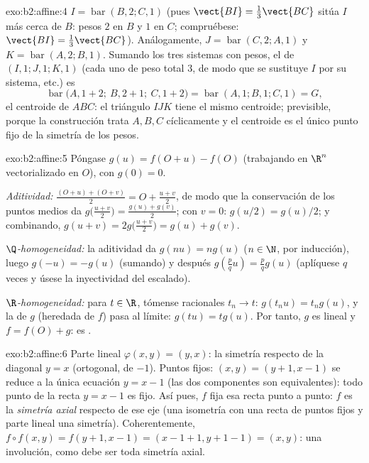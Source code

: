 \begin{solution}{exo:b2:affine:4}
$I = \operatorname{bar}(B, 2; C, 1)$ (pues $\vect{BI} =
\frac13\vect{BC}$ sitúa $I$ más cerca de $B$: pesos $2$ en $B$ y $1$
en $C$; compruébese: $\vect{BI} = \frac{1}{3}\vect{BC}$).
Análogamente, $J = \operatorname{bar}(C, 2; A, 1)$ y $K =
\operatorname{bar}(A, 2; B, 1)$. Sumando los tres sistemas con pesos,
el  de $(I, 1; J, 1; K, 1)$ (cada uno de peso total $3$,
de modo que se sustituye $I$ por su sistema, etc.) es
\[
\operatorname{bar}\bigl(A, 1 + 2;\ B, 2 + 1;\ C, 1 + 2\bigr)
= \operatorname{bar}(A, 1; B, 1; C, 1) = G ,
\]
el centroide de $ABC$: el triángulo $IJK$ tiene el mismo centroide;
previsible, porque la construcción trata $A, B, C$ cíclicamente y el
centroide es el único punto fijo de la simetría  de los
pesos.
\end{solution}

\begin{solution}{exo:b2:affine:5}
Póngase $g(u) = f(O + u) - f(O)$ (trabajando en $\R^n$ vectorializado
en $O$), con $g(0) = 0$.

\emph{Aditividad:} $\frac{(O + u) + (O + v)}{2} = O + \frac{u +
v}{2}$, de modo que la conservación de los puntos medios da
$g\bigl(\frac{u+v}{2}\bigr) = \frac{g(u) + g(v)}{2}$; con $v = 0$:
$g(u/2) = g(u)/2$; y combinando, $g(u + v) =
2g\bigl(\frac{u+v}{2}\bigr) = g(u) + g(v)$.

\emph{$\Q$-homogeneidad:} la aditividad da $g(nu) = ng(u)$ ($n \in
\N$, por inducción), luego $g(-u) = -g(u)$ (sumando) y después
$g(\frac pq u) = \frac pq g(u)$ (aplíquese $q$ veces y úsese la
inyectividad del escalado).

\emph{$\R$-homogeneidad:} para $t \in \R$, tómense racionales $t_n
\to t$: $g(t_nu) = t_ng(u)$, y la  de $g$ (heredada de
$f$) pasa al límite: $g(tu) = tg(u)$. Por tanto, $g$ es lineal y $f =
f(O) + g$: es .
\end{solution}

\begin{solution}{exo:b2:affine:6}
Parte lineal $\varphi(x,y) = (y, x)$: la simetría respecto de la
diagonal $y = x$ (ortogonal, de  $-1$). Puntos fijos: $(x,
y) = (y + 1, x - 1)$ se reduce a la única ecuación $y = x - 1$ (las
dos componentes son equivalentes): todo punto de la recta $y = x - 1$
es fijo. Así pues, $f$ fija esa recta punto a punto: $f$ es la
\emph{simetría axial} respecto de ese eje (una isometría con una
recta de puntos fijos y parte lineal una simetría). Coherentemente,
$f \circ f(x,y) = f(y+1, x-1) = (x - 1 + 1, y + 1 - 1) = (x, y)$: una
involución, como debe ser toda simetría axial.
\end{solution}


